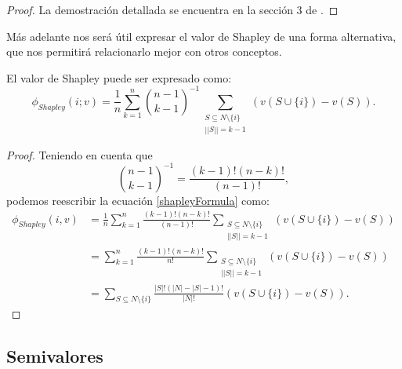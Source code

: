 \begin{proof}
  La demostración detallada se encuentra en la sección 3
  de \cite{shapleyValue}.
\end{proof}

Más adelante nos será útil expresar el valor de Shapley de
una forma alternativa, que nos permitirá relacionarlo mejor
con otros conceptos.

\begin{proposition}
  El valor de Shapley puede ser expresado como:
  \begin{equation}
    \label{shapleyFormula}
    \phi_{Shapley}(i;v)=\frac{1}{n}\sum_{k=1}^n \binom{n-1}{k-1}^{-1} 
    \sum_{\substack{S \subseteq N \setminus \{i\} \\ ||S||=k-1}}(v(S\cup\{i\})-v(S)).
  \end{equation}
\end{proposition}

\begin{proof}
  Teniendo en cuenta que
  \[
  \binom{n-1}{k-1}^{-1} = \frac{(k-1)!(n-k)!}{(n-1)!},
  \]
  podemos reescribir la ecuación \ref{shapleyFormula} como:
  \begin{align*}
    \phi_{Shapley}(i,v) &= \frac{1}{n} \sum_{k=1}^{n} \frac{(k-1)!(n-k)!}{(n-1)!}
    \sum_{\substack{S \subseteq N \setminus \{i\} \\ ||S||=k-1}}(v(S\cup\{i\})-v(S))\\
    &= \sum_{k=1}^{n} \frac{(k-1)!(n-k)!}{n!}
    \sum_{\substack{S \subseteq N \setminus \{i\} \\ ||S||=k-1}}(v(S\cup\{i\})-v(S))\\
    & = \sum_{S\subseteq N \setminus \{i\}} \frac{|S|!(|N|-|S|-1)!}
    {|N|!}(v(S\cup \{i\})-v(S)).
  \end{align*}

\end{proof}



\subsection{Semivalores}

